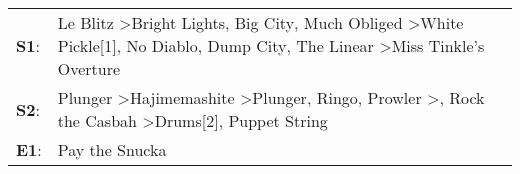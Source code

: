 \begin{supertabular}{p{0.03\textwidth}p{0.92\textwidth}}
 \textbf{S1}:  &              Le Blitz\textsuperscript{} \textgreater \enspace Bright Lights, Big City\textsuperscript{}, \enspace Much Obliged\textsuperscript{} \textgreater \enspace White Pickle[1]\textsuperscript{}, \enspace No Diablo\textsuperscript{}, \enspace Dump City\textsuperscript{}, \enspace The Linear\textsuperscript{} \textgreater \enspace Miss Tinkle's Overture\textsuperscript{}  \enspace  \\
 \textbf{S2}:  &  Plunger\textsuperscript{} \textgreater \enspace Hajimemashite\textsuperscript{} \textgreater \enspace Plunger\textsuperscript{}, \enspace Ringo\textsuperscript{}, \enspace Prowler\textsuperscript{} \textgreater {}\textsuperscript{}, \enspace Rock the Casbah\textsuperscript{} \textgreater \enspace Drums[2]\textsuperscript{}, \enspace Puppet String\textsuperscript{}  \enspace  \\
 \textbf{E1}:  &                                                                                                                                                                                                                                                                                                                                                           Pay the Snucka\textsuperscript{}  \enspace  \\
\end{supertabular}
